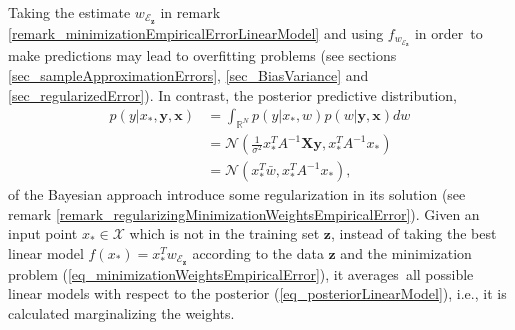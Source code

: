 Taking the estimate $w_{\mathcal{E}_{\pmb{z}}}$ in remark \ref{remark_minimizationEmpiricalErrorLinearModel} and using $f_{w_{\mathcal{E}_{\pmb{z}}}}$ in order to make predictions may lead to overfitting problems (see sections \ref{sec_sampleApproximationErrors}, \ref{sec_BiasVariance} and \ref{sec_regularizedError}). In contrast, the posterior predictive distribution,
\begin{equation} \label{eq_posteriorPredictiveLinearModel}
  \begin{aligned}
    p(y | x_*, \pmb{y}, \pmb{x}) 
      &= \int_{\mathbb{R}^N} p(y | x_*,w)  p(w | \pmb{y}, \pmb{x}) dw \\
      &= \mathcal{N} \left( 
                      \frac{1}{\sigma^2}x_*^TA^{-1}\pmb{X}\pmb{y} ,
                      x_*^T A^{-1} x_*
                     \right) \\
      &= \mathcal{N} \left( 
                      x_*^T\bar{w} ,
                      x_*^T A^{-1} x_*
                     \right),
  \end{aligned}
\end{equation}
of the Bayesian approach introduce some regularization in its solution (see remark \ref{remark_regularizingMinimizationWeightsEmpiricalError}). Given an input point $x_{*} \in \mathcal{X}$ which is not in the training set $\pmb{z}$, instead of taking the best linear model $f(x_*) = x_*^Tw_{\mathcal{E}_{\pmb{z}}}$ according to the data $\pmb{z}$ and the minimization problem (\ref{eq_minimizationWeightsEmpiricalError}), it averages all possible linear models with respect to the posterior (\ref{eq_posteriorLinearModel}), i.e., it is calculated marginalizing the weights.


